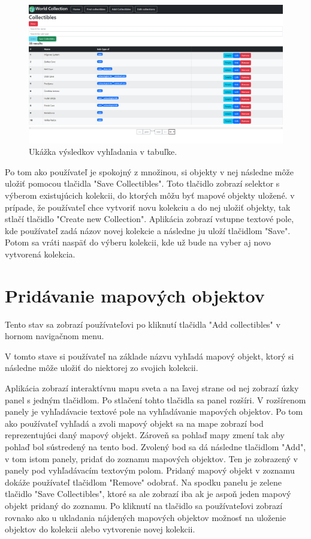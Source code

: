 \begin{figure}[h]
      \includegraphics[width=140mm]{../img/ud-vysledok.png}
      \centering
      \caption{Ukážka výsledkov vyhľadania v tabuľke.}
\end{figure}

Po tom ako používateľ je spokojný z množinou, si objekty v nej následne môže uložiť pomocou tlačidla "Save Collectibles".
Toto tlačidlo zobrazí selektor s výberom existujúcich kolekcii, do ktorých môžu byť mapové objekty uložené.
v prípade, že používateľ chce vytvoriť novu kolekciu a do nej uložiť objekty, tak stlačí tlačidlo "Create new Collection".
Aplikácia zobrazí vstupne textové pole, kde používateľ zadá názov novej kolekcie a následne ju uloží tlačidlom "Save". Potom sa vráti
naspäť do výberu kolekcii, kde už bude na vyber aj novo vytvorená kolekcia.

\section{Pridávanie mapových objektov }

Tento stav sa zobrazí používateľovi po kliknutí tlačidla "Add collectibles" v hornom navigačnom menu.

V tomto stave si používateľ na základe názvu vyhľadá mapový objekt, ktorý si následne môže uložiť do niektorej zo svojich kolekcii.

Aplikácia zobrazí interaktívnu mapu sveta a na ľavej strane od nej zobrazí úzky panel s jedným tlačidlom. Po stlačení tohto tlačidla sa panel rozšíri. V rozšírenom panely je vyhľadávacie textové pole na vyhľadávanie mapových objektov.
Po tom ako používateľ vyhľadá a zvoli mapový objekt sa na mape zobrazí bod reprezentujúci daný mapový objekt. Zároveň sa pohlaď mapy zmení tak aby pohlaď bol sústredený na tento bod. Zvolený bod sa dá následne tlačidlom
"Add", v tom istom panely, pridať do zoznamu mapových objektov. Ten je zobrazený v panely pod vyhľadávacím textovým polom. Pridaný mapový objekt v zoznamu dokáže používateľ tlačidlom "Remove" odobrať. Na spodku panelu je zelene tlačidlo "Save Collectibles",
ktoré sa ale zobrazí iba ak je aspoň jeden mapový objekt pridaný do zoznamu. Po kliknutí na tlačidlo sa používateľovi zobrazí rovnako ako u ukladania nájdených mapových objektov
možnosť na uloženie objektov do kolekcii alebo vytvorenie novej kolekcii.

